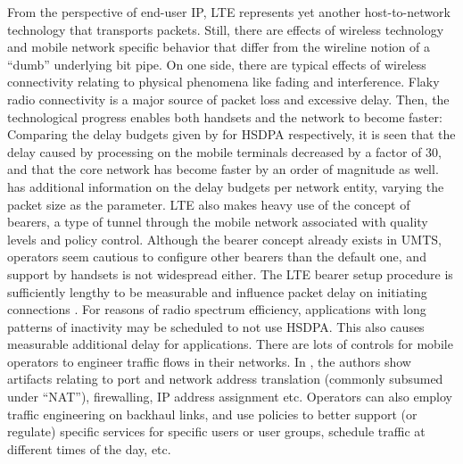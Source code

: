 From the perspective of end-user \gls{IP}, \gls{LTE} represents yet another host-to-network technology that transports packets. Still, there are effects of wireless technology and mobile network specific behavior that differ from the wireline notion of a ``dumb'' underlying bit pipe.
On one side, there are typical effects of wireless connectivity relating to physical phenomena like fading and interference. Flaky radio connectivity is a major source of packet loss and excessive delay. Then, the technological progress enables both handsets and the network to become faster: Comparing the delay budgets given by for \gls{HSDPA} respectively, it is seen that the delay caused by processing on the mobile terminals decreased by a factor of 30, and that the core network has become faster by an order of magnitude as well. \cite{laner2011dissecting3gdelay} has additional information on the delay budgets per network entity, varying the packet size as the parameter.
\gls{LTE} also makes heavy use of the concept of bearers, a type of tunnel through the mobile network associated with quality levels and policy control. Although the bearer concept already exists in \gls{UMTS}, operators seem cautious to configure other bearers than the default one, and support by handsets is not widespread either. The \gls{LTE} bearer setup procedure is sufficiently lengthy to be measurable and influence packet delay on initiating connections \cite{arlos2010packetsizedelayinfluence}. 
For reasons of radio spectrum efficiency, applications with long patterns of inactivity may be scheduled to not use \gls{HSDPA}. This also causes measurable additional delay for applications.
There are lots of controls for mobile operators to engineer traffic flows in their networks. In \cite{sigcomm11middleboxes}, the authors show artifacts relating to port and network address translation (commonly subsumed under ``NAT''), firewalling, IP address assignment etc. Operators can also employ traffic engineering on backhaul links, and use policies to better support (or regulate) specific services for specific users or user groups, schedule traffic at different times of the day, etc.

